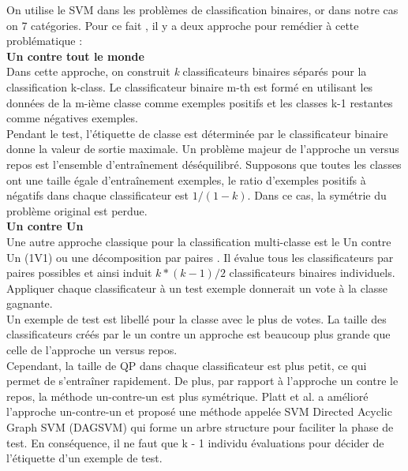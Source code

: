On utilise le SVM dans les problèmes de classification binaires, or dans notre cas on 7 catégories.
Pour ce fait , il y a deux approche pour remédier à cette problématique :\\[1cm]
\textbf{Un contre tout le monde}\\[1cm]
Dans cette approche, on construit \textit{k} classificateurs  binaires séparés
pour la classification k-class. Le classificateur binaire m-th est formé en utilisant les données de
la m-ième classe comme exemples positifs et les classes k-1 restantes comme négatives
exemples.\\[0.2cm]
Pendant le test, l'étiquette de classe est déterminée par le classificateur binaire
donne la valeur de sortie maximale. Un problème majeur de l'approche un versus repos est
l'ensemble d'entraînement déséquilibré. Supposons que toutes les classes ont une taille égale d'entraînement exemples, le ratio d'exemples positifs à négatifs dans chaque classificateur est
$ 1/(1-k) $. Dans ce cas, la symétrie du problème original est perdue. \\[1cm]
\textbf{Un contre Un}\\[1cm]
Une autre approche classique pour la classification multi-classe est le Un contre Un (1V1)
ou une décomposition par paires . Il évalue tous les classificateurs par paires possibles et ainsi
induit $ k *(k - 1) / 2 $ classificateurs binaires individuels. Appliquer chaque classificateur à un test
exemple donnerait un vote à la classe gagnante. \\[0.5cm]
Un exemple de test est libellé pour la classe avec le plus de votes. La taille des classificateurs créés par le un contre un approche est beaucoup plus grande que celle de l'approche un versus repos.\\[0.5cm] Cependant, la taille de QP dans chaque classificateur est plus petit, ce qui permet de s'entraîner rapidement. De plus, par rapport à l'approche un contre le repos, la méthode un-contre-un est plus
symétrique. Platt et al. a amélioré l'approche un-contre-un et proposé
une méthode appelée SVM Directed Acyclic Graph SVM (DAGSVM) qui forme un arbre
structure pour faciliter la phase de test. En conséquence, il ne faut que k - 1 individu
évaluations pour décider de l'étiquette d'un exemple de test.\\[1.5cm]

